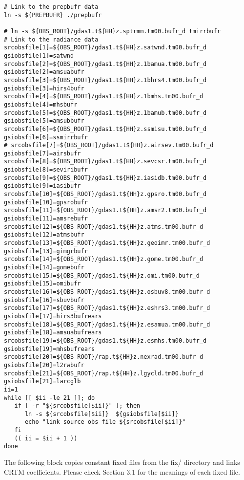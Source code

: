 \begin{footnotesize}
\begin{verbatim}
# Link to the prepbufr data
ln -s ${PREPBUFR} ./prepbufr

# ln -s ${OBS_ROOT}/gdas1.t${HH}z.sptrmm.tm00.bufr_d tmirrbufr
# Link to the radiance data
srcobsfile[1]=${OBS_ROOT}/gdas1.t${HH}z.satwnd.tm00.bufr_d
gsiobsfile[1]=satwnd
srcobsfile[2]=${OBS_ROOT}/gdas1.t${HH}z.1bamua.tm00.bufr_d
gsiobsfile[2]=amsuabufr
srcobsfile[3]=${OBS_ROOT}/gdas1.t${HH}z.1bhrs4.tm00.bufr_d
gsiobsfile[3]=hirs4bufr
srcobsfile[4]=${OBS_ROOT}/gdas1.t${HH}z.1bmhs.tm00.bufr_d
gsiobsfile[4]=mhsbufr
srcobsfile[5]=${OBS_ROOT}/gdas1.t${HH}z.1bamub.tm00.bufr_d
gsiobsfile[5]=amsubbufr
srcobsfile[6]=${OBS_ROOT}/gdas1.t${HH}z.ssmisu.tm00.bufr_d
gsiobsfile[6]=ssmirrbufr
# srcobsfile[7]=${OBS_ROOT}/gdas1.t${HH}z.airsev.tm00.bufr_d
gsiobsfile[7]=airsbufr
srcobsfile[8]=${OBS_ROOT}/gdas1.t${HH}z.sevcsr.tm00.bufr_d
gsiobsfile[8]=seviribufr
srcobsfile[9]=${OBS_ROOT}/gdas1.t${HH}z.iasidb.tm00.bufr_d
gsiobsfile[9]=iasibufr
srcobsfile[10]=${OBS_ROOT}/gdas1.t${HH}z.gpsro.tm00.bufr_d
gsiobsfile[10]=gpsrobufr
srcobsfile[11]=${OBS_ROOT}/gdas1.t${HH}z.amsr2.tm00.bufr_d
gsiobsfile[11]=amsrebufr
srcobsfile[12]=${OBS_ROOT}/gdas1.t${HH}z.atms.tm00.bufr_d
gsiobsfile[12]=atmsbufr
srcobsfile[13]=${OBS_ROOT}/gdas1.t${HH}z.geoimr.tm00.bufr_d
gsiobsfile[13]=gimgrbufr
srcobsfile[14]=${OBS_ROOT}/gdas1.t${HH}z.gome.tm00.bufr_d
gsiobsfile[14]=gomebufr
srcobsfile[15]=${OBS_ROOT}/gdas1.t${HH}z.omi.tm00.bufr_d
gsiobsfile[15]=omibufr
srcobsfile[16]=${OBS_ROOT}/gdas1.t${HH}z.osbuv8.tm00.bufr_d
gsiobsfile[16]=sbuvbufr
srcobsfile[17]=${OBS_ROOT}/gdas1.t${HH}z.eshrs3.tm00.bufr_d
gsiobsfile[17]=hirs3bufrears
srcobsfile[18]=${OBS_ROOT}/gdas1.t${HH}z.esamua.tm00.bufr_d
gsiobsfile[18]=amsuabufrears
srcobsfile[19]=${OBS_ROOT}/gdas1.t${HH}z.esmhs.tm00.bufr_d
gsiobsfile[19]=mhsbufrears
srcobsfile[20]=${OBS_ROOT}/rap.t${HH}z.nexrad.tm00.bufr_d
gsiobsfile[20]=l2rwbufr
srcobsfile[21]=${OBS_ROOT}/rap.t${HH}z.lgycld.tm00.bufr_d
gsiobsfile[21]=larcglb
ii=1
while [[ $ii -le 21 ]]; do
   if [ -r "${srcobsfile[$ii]}" ]; then
      ln -s ${srcobsfile[$ii]}  ${gsiobsfile[$ii]}
      echo "link source obs file ${srcobsfile[$ii]}"
   fi
   (( ii = $ii + 1 ))
done
\end{verbatim}
\end{footnotesize}

The following block copies constant fixed files from the fix/ directory and links CRTM coefficients. Please check Section 3.1 for the meanings of each fixed file. 

